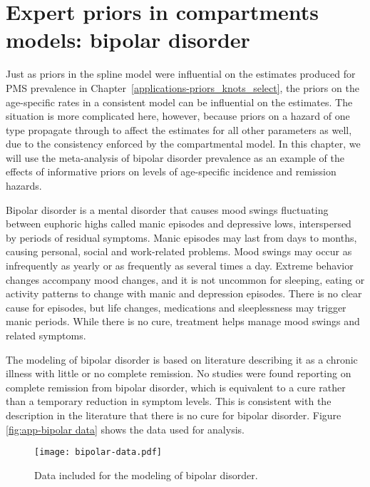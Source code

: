 \chapter{Expert priors in compartments models: bipolar disorder}
\label{applications-prior_level_vals}

Just as priors in the spline model were influential on the estimates
produced for PMS prevalence in
Chapter~\ref{applications-priors_knots_select}, the priors on the
age-specific rates in a consistent model can be influential on the
estimates.  The situation is more complicated here, however, because
priors on a hazard of one type propagate through to affect the
estimates for all other parameters as well, due to the consistency
enforced by the compartmental model.  In this chapter, we will use the
meta-analysis of bipolar disorder prevalence as an example of the
effects of informative priors on levels of age-specific incidence and
remission hazards.

Bipolar disorder is a mental disorder that causes mood swings
fluctuating between euphoric highs called manic episodes and
depressive lows, interspersed by periods of residual symptoms.  Manic
episodes may last from days to months, causing personal, social and
work-related problems.  Mood swings may occur as infrequently as
yearly or as frequently as several times a day.  Extreme behavior
changes accompany mood changes, and it is not uncommon for sleeping,
eating or activity patterns to change with manic and depression
episodes.  There is no clear cause for episodes, but life changes,
medications and sleeplessness may trigger manic periods.  While there
is no cure, treatment helps manage mood swings and related
symptoms. \cite{kloos_bipolar_2011, angst_historical_2000}

The modeling of bipolar disorder is based on literature describing it
as a chronic illness with little or no complete remission.  No studies
were found reporting on complete remission from bipolar disorder,
which is equivalent to a cure rather than a temporary reduction in
symptom levels.  This is consistent with the description in the
literature that there is no cure for bipolar
disorder. \cite{association_diagnostic_2000} Figure \ref{fig:app-bipolar
  data} shows the data used for analysis.

    \begin{figure}[h]
        \begin{center}
            \texttt{[image: bipolar-data.pdf]}
            \caption{Data included for the modeling of bipolar
              disorder.}
            \label{fig:app-bipolar data}
        \end{center}
    \end{figure}

